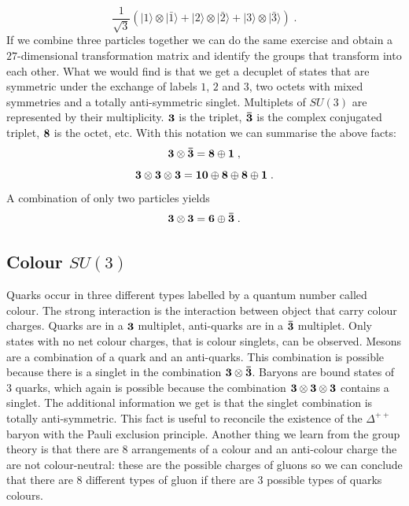 \documentclass[12pt]{article}
\begin{document}
\[\frac{1}{\sqrt{3}}\left(
|1\rangle \otimes |\bar1\rangle +
|2\rangle \otimes |\bar2\rangle +
|3\rangle \otimes|\bar3\rangle 
\right)\;.\]
If we combine three particles together we can do the same exercise and obtain a $27$-dimensional transformation matrix and identify the groups that transform into each other. What we would find is that we get a decuplet of states that are symmetric under the exchange of labels $1$, $2$ and $3$, two octets with mixed symmetries and a totally anti-symmetric singlet.
Multiplets of $SU(3)$ are represented by their multiplicity. ${\bf 3}$ is the triplet, ${\bf \bar 3}$ is the complex conjugated triplet, ${\bf 8}$ is the octet, etc. With this notation we can summarise the above facts:
\[{\bf 3}\otimes {\bf\bar{3}}={\bf 8}\oplus {\bf 1}\;,\]
\[{\bf 3}\otimes {\bf 3}\otimes {\bf 3}={\bf 10}\oplus {\bf 8}\oplus {\bf 8}\oplus {\bf 1}\;.\]
A combination of only two particles yields
\[{\bf 3}\otimes {\bf 3}={\bf 6}\oplus {\bf \bar{3}}\;.\]
\subsection{Colour $SU(3)$}
Quarks occur in three different types labelled by a quantum number called colour. The strong interaction is the interaction between object that carry colour charges. Quarks are in a ${\bf 3}$ multiplet, anti-quarks are in a ${\bf \bar{3}}$ multiplet. Only states with no net colour charges, that is colour singlets, can be observed. Mesons are a combination of a quark and an anti-quarks. This combination is possible because there is a singlet in the combination ${\bf 3}\otimes {\bf \bar{3}}$. Baryons are bound states of 3 quarks, which again is possible because the combination ${\bf 3}\otimes {\bf 3}\otimes {\bf 3}$ contains a singlet. The additional information we get is that the singlet combination is totally anti-symmetric. This fact is useful to reconcile the existence of the $\Delta^{++}$ baryon with the Pauli exclusion principle. Another thing we learn from the group theory is that there are $8$ arrangements of a colour and an anti-colour charge the are not colour-neutral: these are the possible charges of gluons so we can conclude that there are 8 different types of gluon if there are 3 possible types of quarks colours.
\end{document}
